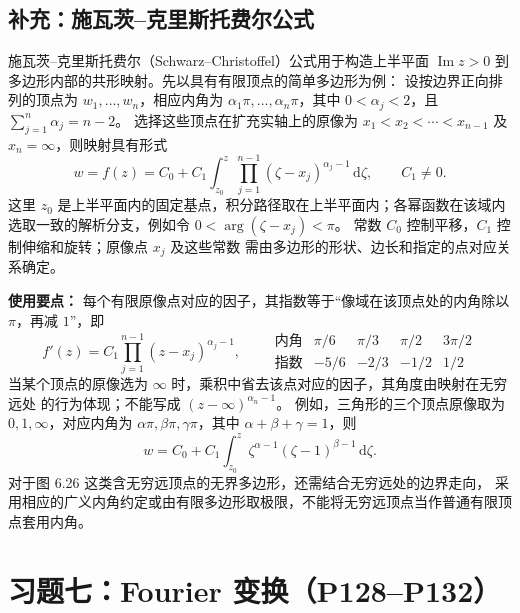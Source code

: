 \documentclass[UTF8,11pt,a4paper]{ctexart}
\newcommand{\dd}{\,\mathrm{d}}
\newcommand{\Arg}{\operatorname{arg}}
\newcommand{\Imm}{\operatorname{Im}}
\begin{document}
\subsection*{补充：施瓦茨--克里斯托费尔公式}

施瓦茨--克里斯托费尔（Schwarz--Christoffel）公式用于构造上半平面
$\Imm z>0$ 到多边形内部的共形映射。先以具有有限顶点的简单多边形为例：
设按边界正向排列的顶点为 $w_1,\ldots,w_n$，相应内角为
$\alpha_1\pi,\ldots,\alpha_n\pi$，其中 $0<\alpha_j<2$，且
$\sum_{j=1}^n\alpha_j=n-2$。
选择这些顶点在扩充实轴上的原像为
$x_1<x_2<\cdots<x_{n-1}$ 及 $x_n=\infty$，则映射具有形式
\[
\boxed{\displaystyle
w=f(z)=C_0+C_1\int_{z_0}^{z}
\prod_{j=1}^{n-1}(\zeta-x_j)^{\alpha_j-1}\dd\zeta,
\qquad C_1\ne0.}
\]
这里 $z_0$ 是上半平面内的固定基点，积分路径取在上半平面内；各幂函数在该域内
选取一致的解析分支，例如令 $0<\Arg(\zeta-x_j)<\pi$。
常数 $C_0$ 控制平移，$C_1$ 控制伸缩和旋转；原像点 $x_j$ 及这些常数
需由多边形的形状、边长和指定的点对应关系确定。

\noindent\textbf{使用要点：}
每个有限原像点对应的因子，其指数等于“像域在该顶点处的内角除以 $\pi$，再减 $1$”，即
\[
f'(z)=C_1\prod_{j=1}^{n-1}(z-x_j)^{\alpha_j-1},
\qquad
\begin{array}{c|cccc}
\text{内角} & \pi/6 & \pi/3 & \pi/2 & 3\pi/2\\
\hline
\text{指数} & -5/6 & -2/3 & -1/2 & 1/2
\end{array}
\]
当某个顶点的原像选为 $\infty$ 时，乘积中省去该点对应的因子，其角度由映射在无穷远处
的行为体现；不能写成 $(z-\infty)^{\alpha_n-1}$。
例如，三角形的三个顶点原像取为 $0,1,\infty$，对应内角为
$\alpha\pi,\beta\pi,\gamma\pi$，其中 $\alpha+\beta+\gamma=1$，则
\[
w=C_0+C_1\int_{z_0}^{z}
\zeta^{\alpha-1}(\zeta-1)^{\beta-1}\dd\zeta.
\]
对于图 6.26 这类含无穷远顶点的无界多边形，还需结合无穷远处的边界走向，
采用相应的广义内角约定或由有限多边形取极限，不能将无穷远顶点当作普通有限顶点套用内角。


\newpage
\section{习题七：Fourier 变换（P128--P132）}
\end{document}

